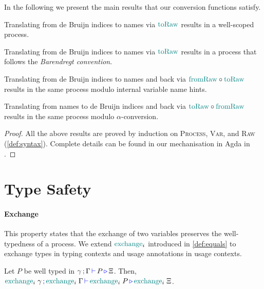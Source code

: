 In the following we present the main results that our conversion functions satisfy.

\begin{nilemma}
  Translating from de Bruijn indices to names via $\textcolor{teal}{\operatorname{toRaw}}$ results in a well-scoped process.
\end{nilemma}

\begin{nilemma}
  Translating from de Bruijn indices to names via $\textcolor{teal}{\operatorname{toRaw}}$ results in a process that follows the \emph{Barendregt convention}.
\end{nilemma}

\begin{nilemma}
  Translating from de Bruijn indices to names and back via $\textcolor{teal}{\operatorname{fromRaw}} \circ \textcolor{teal}{\operatorname{toRaw}}$ results in the same process modulo internal variable name hints.
\end{nilemma}

\begin{nilemma}
  Translating from names to de Bruijn indices and back via $\textcolor{teal}{\operatorname{toRaw}} \circ \textcolor{teal}{\operatorname{fromRaw}}$ results in the same process modulo $\alpha$-conversion.
\end{nilemma}

\begin{proof}[Proof]
  All the above results are proved by induction on \textsc{Process}, \textsc{Var}, and \textsc{Raw} (\autoref{def:syntax}).
  Complete details can be found in our mechanisation in Agda in \cite{Zalakain2020Agda}.
\end{proof}

\section{Type Safety} \label{app:type-safety}

\paragraph*{Exchange}
This property states that the exchange of two variables preserves the well-typedness of a process.
We extend $\textcolor{teal}{\operatorname{exchange}}_i$  introduced in \autoref{def:equals} to exchange types in typing contexts and usage annotations in usage contexts.
\begin{nitheorem}[Exchange]
  \label{thm:exchange}
  Let $P$ be well typed in $\gamma \, \textcolor{blue}{\operatorname{;}} \, \Gamma \, \textcolor{blue}{\operatorname{\vdash}} \, P \, \textcolor{blue}{\operatorname{\triangleright}} \, \Xi$.
  Then, $\textcolor{teal}{\operatorname{exchange}}_i \; \gamma \, \textcolor{blue}{\operatorname{;}} \, \textcolor{teal}{\operatorname{exchange}}_i \; \Gamma \, \textcolor{blue}{\operatorname{\vdash}} \, \allowbreak \textcolor{teal}{\operatorname{exchange}}_i \; P \, \textcolor{blue}{\operatorname{\triangleright}} \, \textcolor{teal}{\operatorname{exchange}}_i \; \Xi$.
\end{nitheorem}

